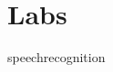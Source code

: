 \documentclass[nociteref]{SIAM-GH-book}
\begin{document}
\part{Labs}
%
%
%
%
%
%
{speechrecognition}
%
%
%
%
\end{document}
